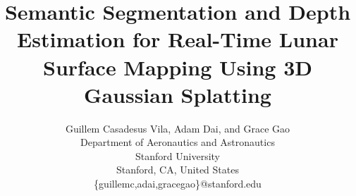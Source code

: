 \documentclass[twocolumn,letterpaper]{IEEEAerospaceCLS}
\begin{document}

\title{Semantic Segmentation and Depth Estimation for Real-Time Lunar Surface Mapping Using 3D Gaussian Splatting}

\author{%
    Guillem Casadesus Vila, Adam Dai, and Grace Gao\\
    Department of Aeronautics and Astronautics\\
    Stanford University\\
    Stanford, CA, United States\\
    \{guillemc,adai,gracegao\}@stanford.edu
}

\maketitle

\thispagestyle{plain}
\pagestyle{plain}


\tableofcontents







\small



\vspace{10em}

\end{document}
